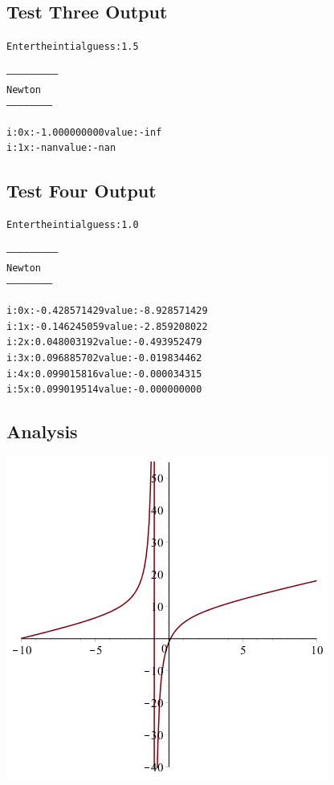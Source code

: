 \documentclass[11pt]{article} %
\begin{document}
\subsection*{Test Three Output}
\begin{alltt}

Enter the intial guess: 1.5

--------------------------
 Newton
 -----------------------


i: 0	x: -1.000000000	value: -inf
i: 1	x: -nan	value: -nan

\end{alltt}


\subsection*{Test Four Output}
\begin{alltt}
Enter the intial guess: 1.0

--------------------------
 Newton
 -----------------------


i: 0	x: -0.428571429	value: -8.928571429
i: 1	x: -0.146245059	value: -2.859208022
i: 2	x: 0.048003192	value: -0.493952479
i: 3	x: 0.096885702	value: -0.019834462
i: 4	x: 0.099015816	value: -0.000034315
i: 5	x: 0.099019514	value: -0.000000000

\end{alltt}

\subsection*{Analysis}
\includegraphics[scale=.5]{plots/newtongraph1.png}
\end{document}
